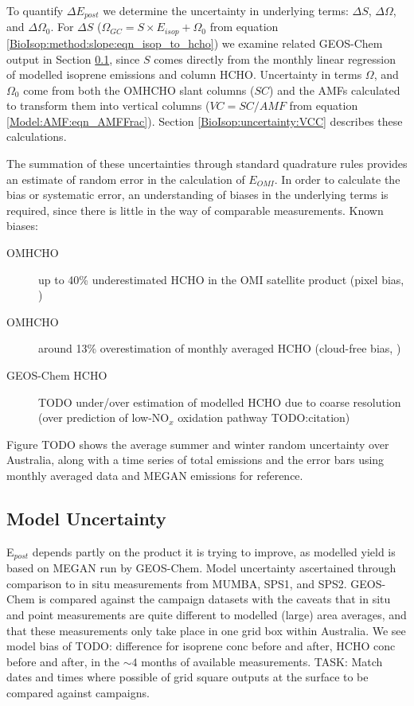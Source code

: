     To quantify $\Delta{E_{post}}$ we determine the uncertainty in underlying terms: $\Delta{S}$, $\Delta{\Omega}$, and $\Delta{\Omega_0}$. 
    For $\Delta{S}$ ($\Omega_{GC} = S \times E_{isop} + \Omega_0$ from equation \ref{BioIsop:method:slope:eqn_isop_to_hcho}) we examine related GEOS-Chem output in Section \ref{BioIsop:uncertainty:Model}, since $S$ comes directly from the monthly linear regression of modelled isoprene emissions and column HCHO.
    Uncertainty in terms $\Omega$, and $\Omega_0$ come from both the OMHCHO slant columns ($SC$) and the AMFs calculated to transform them into vertical columns ($VC = SC/AMF$ from equation \ref{Model:AMF:eqn_AMFFrac}).
    Section \ref{BioIsop:uncertainty:VCC} describes these calculations.
    
    The summation of these uncertainties through standard quadrature rules provides an estimate of random error in the calculation of $E_{OMI}$.
    In order to calculate the bias or systematic error, an understanding of biases in the underlying terms is required, since there is little in the way of comparable measurements.
    Known biases: 
    \begin{description}
      \item[OMHCHO] up to 40\% underestimated HCHO in the OMI satellite product (pixel bias, \parencite{Zhu2016,DeSmedt2015,Barkley2013})
      \item[OMHCHO] around 13\% overestimation of monthly averaged HCHO (cloud-free bias, \parencite{Surl2018})
      \item[GEOS-Chem HCHO] TODO under/over estimation of modelled HCHO due to coarse resolution (over prediction of low-NO$_x$ oxidation pathway TODO:citation)
    \end{description}
    
    Figure TODO shows the average summer and winter random uncertainty over Australia, along with a time series of total emissions and the error bars using monthly averaged data and MEGAN emissions for reference.
  
  \subsection{Model Uncertainty}
    \label{BioIsop:uncertainty:Model}
    
    E$_{post}$ depends partly on the product it is trying to improve, as modelled yield is based on MEGAN run by GEOS-Chem.
    Model uncertainty ascertained through comparison to in situ measurements from MUMBA, SPS1, and SPS2.
    GEOS-Chem is compared against the campaign datasets with the caveats that in situ and point measurements are quite different to modelled (large) area averages, and that these measurements only take place in one grid box within Australia.
    We see model bias of TODO: difference for isoprene conc before and after, HCHO conc before and after, in the $\sim 4$ months of available measurements.
    TASK: Match dates and times where possible of grid square outputs at the surface to be compared against campaigns.
    
